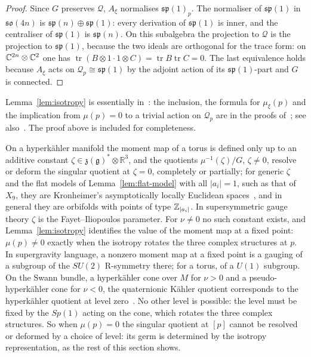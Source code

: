 \begin{proof}
Since $G$ preserves $\mathcal Q$, $A_\xi$ normalises $\mathfrak{sp}(1)_p$. The normaliser of
$\mathfrak{sp}(1)$ in $\mathfrak{so}(4n)$ is $\mathfrak{sp}(n)\oplus\mathfrak{sp}(1)$: every
derivation of $\mathfrak{sp}(1)$ is inner, and the centraliser of $\mathfrak{sp}(1)$ is
$\mathfrak{sp}(n)$. On this subalgebra the projection to $\mathcal Q$ is the projection to
$\mathfrak{sp}(1)$, because the two ideals are orthogonal for the trace form: on
$\mathbb C^{2n}\otimes\mathbb C^2$ one has
$\operatorname{tr}(B\otimes1\cdot1\otimes C)=\operatorname{tr}B\operatorname{tr}C=0$. The last
equivalence holds because $A_\xi$ acts on $\mathcal Q_p\cong\mathfrak{sp}(1)$ by the adjoint
action of its $\mathfrak{sp}(1)$-part and $G$ is connected.
\end{proof}

Lemma~\ref{lem:isotropy} is essentially in~\cite[Sect.~4]{DancerSwann:1997}: the inclusion, the formula
for $\mu_\xi(p)$ and the implication from $\mu(p)=0$ to a trivial action on $\mathcal Q_p$ are in the proofs
of~\cite[Prop.~4.2 and Thm.~4.6]{DancerSwann:1997}; see also~\cite{Swann:1991}. The proof above is included for
completeness.

\begin{remark}\label{rem:no-fi}
On a hyperk\"ahler manifold the moment map of a torus is defined only up to an additive constant
$\zeta\in\mathfrak z(\mathfrak g)^*\otimes\mathbb R^3$, and the quotients $\mu^{-1}(\zeta)/G$,
$\zeta\neq0$, resolve or deform the singular quotient at $\zeta=0$, completely or partially; for
generic $\zeta$ and the flat models of Lemma~\ref{lem:flat-model} with all $|a_i|=1$, such as that
of $X_9$, they are
Kronheimer's asymptotically locally Euclidean spaces~\cite{Kronheimer:1989}, and in general they
are orbifolds with points of type $\mathbb Z_{|a_i|}$. In supersymmetric gauge theory $\zeta$ is the Fayet--Iliopoulos
parameter. For $\nu\neq0$ no such constant exists, and Lemma~\ref{lem:isotropy} identifies the
value of the moment map at a fixed point: $\mu(p)\neq0$ exactly when the isotropy rotates the
three complex structures at $p$. In supergravity language, a nonzero moment map at a fixed point
is a gauging of a subgroup of the $SU(2)$ R-symmetry there; for a torus, of a $U(1)$ subgroup.
On the Swann bundle, a hyperk\"ahler cone over $M$ for $\nu>0$ and a pseudo-hyperk\"ahler cone
for $\nu<0$, the quaternionic K\"ahler quotient corresponds to the hyperk\"ahler quotient at level
zero~\cite{Swann:1991}. No other level is possible: the level must be fixed by the $Sp(1)$ acting
on the cone, which rotates the three complex structures. So when
$\mu(p)=0$ the singular quotient at $[p]$ cannot be resolved or deformed by a choice of level:
its germ is determined by the isotropy representation, as the rest of this section shows.
\end{remark}

